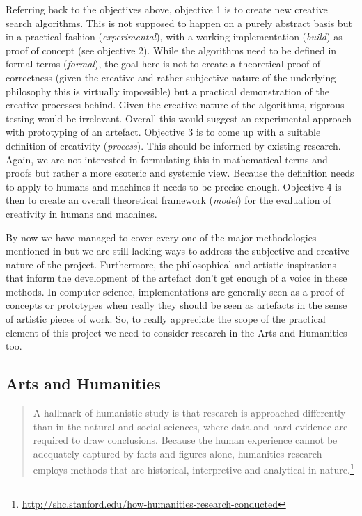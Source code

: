 Referring back to the objectives above, objective \num{1} is to create new creative search algorithms. This is not supposed to happen on a purely abstract basis but in a practical fashion (\emph{experimental}), with a working implementation (\emph{build}) as proof of concept (see objective 2). While the algorithms need to be defined in formal terms (\emph{formal}), the goal here is not to create a theoretical proof of correctness (given the creative and rather subjective nature of the underlying philosophy this is virtually impossible) but a practical demonstration of the creative processes behind. Given the creative nature of the algorithms, rigorous testing would be irrelevant. Overall this would suggest an experimental approach with prototyping of an artefact. Objective \num{3} is to come up with a suitable definition of creativity (\emph{process}). This should be informed by existing research. Again, we are not interested in formulating this in mathematical terms and proofs but rather a more esoteric and systemic view. Because the definition needs to apply to humans and machines it needs to be precise enough. Objective \num{4} is then to create an overall theoretical framework (\emph{model}) for the evaluation of creativity in humans and machines.

By now we have managed to cover every one of the major methodologies mentioned in \autocite{Amaral} but we are still lacking ways to address the subjective and creative nature of the project. Furthermore, the philosophical and artistic inspirations that inform the development of the artefact don't get enough of a voice in these methods. In computer science, implementations are generally seen as a proof of concepts or prototypes when really they should be seen as artefacts in the sense of artistic pieces of work. So, to really appreciate the scope of the practical element of this project we need to consider research in the Arts and Humanities too.


\subsection{Arts and Humanities}



\begin{quotation}
  A hallmark of humanistic study is that research is approached differently than in the natural and social sciences, where data and hard evidence are required to draw conclusions. Because the human experience cannot be adequately captured by facts and figures alone, humanities research employs methods that are historical, interpretive and analytical in nature.\footnote{\url{http://shc.stanford.edu/how-humanities-research-conducted}}
\end{quotation}

